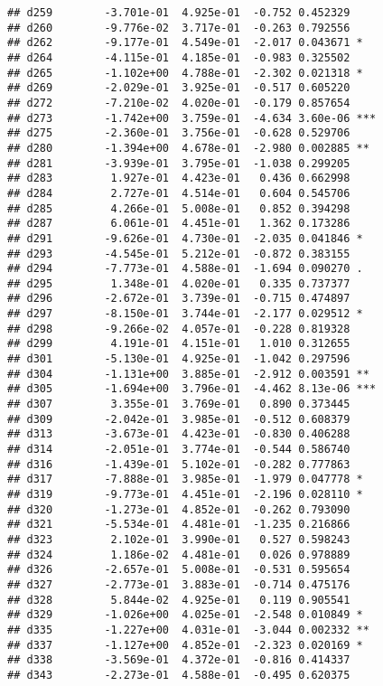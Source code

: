 \documentclass[
]{article}
\begin{document}
\begin{verbatim}
## d259        -3.701e-01  4.925e-01  -0.752 0.452329    
## d260        -9.776e-02  3.717e-01  -0.263 0.792556    
## d262        -9.177e-01  4.549e-01  -2.017 0.043671 *  
## d264        -4.115e-01  4.185e-01  -0.983 0.325502    
## d265        -1.102e+00  4.788e-01  -2.302 0.021318 *  
## d269        -2.029e-01  3.925e-01  -0.517 0.605220    
## d272        -7.210e-02  4.020e-01  -0.179 0.857654    
## d273        -1.742e+00  3.759e-01  -4.634 3.60e-06 ***
## d275        -2.360e-01  3.756e-01  -0.628 0.529706    
## d280        -1.394e+00  4.678e-01  -2.980 0.002885 ** 
## d281        -3.939e-01  3.795e-01  -1.038 0.299205    
## d283         1.927e-01  4.423e-01   0.436 0.662998    
## d284         2.727e-01  4.514e-01   0.604 0.545706    
## d285         4.266e-01  5.008e-01   0.852 0.394298    
## d287         6.061e-01  4.451e-01   1.362 0.173286    
## d291        -9.626e-01  4.730e-01  -2.035 0.041846 *  
## d293        -4.545e-01  5.212e-01  -0.872 0.383155    
## d294        -7.773e-01  4.588e-01  -1.694 0.090270 .  
## d295         1.348e-01  4.020e-01   0.335 0.737377    
## d296        -2.672e-01  3.739e-01  -0.715 0.474897    
## d297        -8.150e-01  3.744e-01  -2.177 0.029512 *  
## d298        -9.266e-02  4.057e-01  -0.228 0.819328    
## d299         4.191e-01  4.151e-01   1.010 0.312655    
## d301        -5.130e-01  4.925e-01  -1.042 0.297596    
## d304        -1.131e+00  3.885e-01  -2.912 0.003591 ** 
## d305        -1.694e+00  3.796e-01  -4.462 8.13e-06 ***
## d307         3.355e-01  3.769e-01   0.890 0.373445    
## d309        -2.042e-01  3.985e-01  -0.512 0.608379    
## d313        -3.673e-01  4.423e-01  -0.830 0.406288    
## d314        -2.051e-01  3.774e-01  -0.544 0.586740    
## d316        -1.439e-01  5.102e-01  -0.282 0.777863    
## d317        -7.888e-01  3.985e-01  -1.979 0.047778 *  
## d319        -9.773e-01  4.451e-01  -2.196 0.028110 *  
## d320        -1.273e-01  4.852e-01  -0.262 0.793090    
## d321        -5.534e-01  4.481e-01  -1.235 0.216866    
## d323         2.102e-01  3.990e-01   0.527 0.598243    
## d324         1.186e-02  4.481e-01   0.026 0.978889    
## d326        -2.657e-01  5.008e-01  -0.531 0.595654    
## d327        -2.773e-01  3.883e-01  -0.714 0.475176    
## d328         5.844e-02  4.925e-01   0.119 0.905541    
## d329        -1.026e+00  4.025e-01  -2.548 0.010849 *  
## d335        -1.227e+00  4.031e-01  -3.044 0.002332 ** 
## d337        -1.127e+00  4.852e-01  -2.323 0.020169 *  
## d338        -3.569e-01  4.372e-01  -0.816 0.414337    
## d343        -2.273e-01  4.588e-01  -0.495 0.620375    

\end{verbatim}
\end{document}
